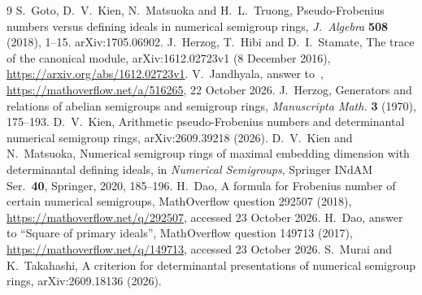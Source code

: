 \documentclass[11pt]{amsart}
\theoremstyle{remark}
\begin{document}
\begin{thebibliography}{9}
 S.~Goto, D.~V.~Kien, N.~Matsuoka and H.~L.~Truong, Pseudo-Frobenius numbers versus defining ideals in numerical semigroup rings, \emph{J.~Algebra} \textbf{508} (2018), 1--15. arXiv:1705.06902.
 J.~Herzog, T.~Hibi and D.~I.~Stamate, The trace of the canonical module, arXiv:1612.02723v1 (8 December 2016), \url{https://arxiv.org/abs/1612.02723v1}.
 V.~Jandhyala, answer to~\cite{MO}, \url{https://mathoverflow.net/a/516265}, 22 October 2026.
 J.~Herzog, Generators and relations of abelian semigroups and semigroup rings, \emph{Manuscripta Math.} \textbf{3} (1970), 175--193.
 D.~V.~Kien, Arithmetic pseudo-Frobenius numbers and determinantal numerical semigroup rings, arXiv:2609.39218 (2026).
 D.~V.~Kien and N.~Matsuoka, Numerical semigroup rings of maximal embedding dimension with determinantal defining ideals, in \emph{Numerical Semigroups}, Springer INdAM Ser.~\textbf{40}, Springer, 2020, 185--196.
 H.~Dao, A formula for Frobenius number of certain numerical semigroups, MathOverflow question 292507 (2018), \url{https://mathoverflow.net/q/292507}, accessed 23 October 2026.
 H.~Dao, answer to ``Square of primary ideals'', MathOverflow question 149713 (2017), \url{https://mathoverflow.net/q/149713}, accessed 23 October 2026.
 S.~Murai and K.~Takahashi, A criterion for determinantal presentations of numerical semigroup rings, arXiv:2609.18136 (2026).
\end{thebibliography}
\end{document}
